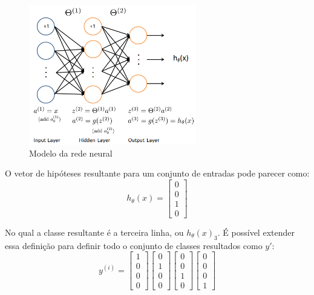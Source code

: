 \begin{figure}
\centering
\caption{Modelo da rede neural} \label{fig:redeneuralmulticlass}
\includegraphics[width=0.65\textwidth]{img/redeneuralmulticlass}
\end{figure}

O vetor de hipóteses resultante para um conjunto de entradas pode parecer como:
\begin{equation}
h_{\theta}(x) = \begin{bmatrix} 0 \\ 0 \\ 1 \\ 0 \end{bmatrix} \nonumber
\end{equation}

No qual a classe resultante é a terceira linha, ou $h_{\theta}(x)_3$. É possível extender essa definição para definir todo o conjunto de classes resultados como $y'$:
\begin{equation}
y^{(i)} = \begin{bmatrix} 1 \\ 0 \\ 0 \\ 0 \end{bmatrix} \begin{bmatrix} 0 \\ 1 \\ 0 \\ 0 \end{bmatrix} \begin{bmatrix} 0 \\ 0 \\ 1 \\ 0 \end{bmatrix} \begin{bmatrix} 0 \\ 0 \\ 0 \\ 1 \end{bmatrix} \nonumber
\end{equation}

